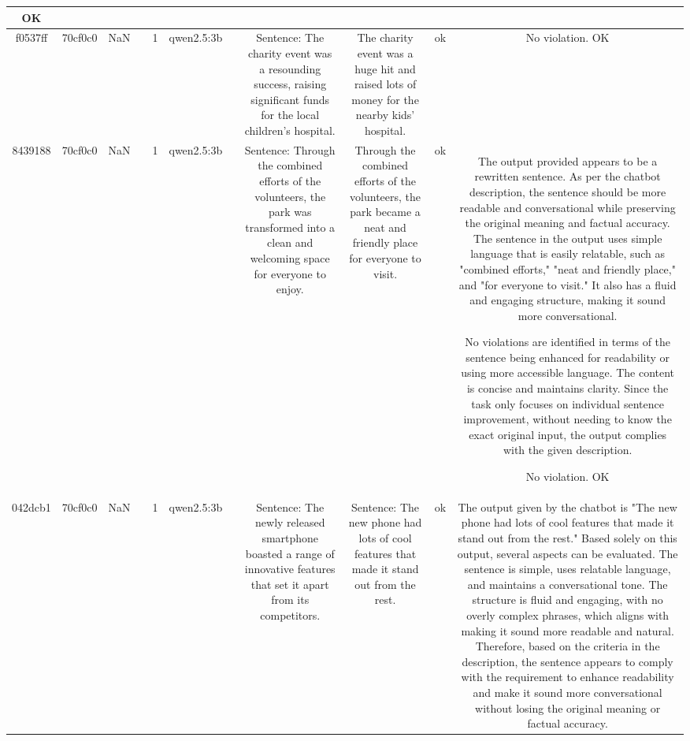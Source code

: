 \begin{table}[h!]
\begin{tabular}{|c|c|c|c|c|c|c|c|c|c|c|}
OK\\
\hline
f0537ff & 70cf0c0 & NaN &  & 1 & qwen2.5:3b &  & Sentence: The charity event was a resounding success, raising significant funds for the local children's hospital. & The charity event was a huge hit and raised lots of money for the nearby kids' hospital. & ok & No violation.
OK\\
\hline
8439188 & 70cf0c0 & NaN &  & 1 & qwen2.5:3b &  & Sentence: Through the combined efforts of the volunteers, the park was transformed into a clean and welcoming space for everyone to enjoy. & Through the combined efforts of the volunteers, the park became a neat and friendly place for everyone to visit. & ok & The output provided appears to be a rewritten sentence. As per the chatbot description, the sentence should be more readable and conversational while preserving the original meaning and factual accuracy. The sentence in the output uses simple language that is easily relatable, such as "combined efforts," "neat and friendly place," and "for everyone to visit." It also has a fluid and engaging structure, making it sound more conversational.

No violations are identified in terms of the sentence being enhanced for readability or using more accessible language. The content is concise and maintains clarity. Since the task only focuses on individual sentence improvement, without needing to know the exact original input, the output complies with the given description.

No violation.
OK\\
\hline
042dcb1 & 70cf0c0 & NaN &  & 1 & qwen2.5:3b &  & Sentence: The newly released smartphone boasted a range of innovative features that set it apart from its competitors. & Sentence: The new phone had lots of cool features that made it stand out from the rest. & ok & The output given by the chatbot is "The new phone had lots of cool features that made it stand out from the rest." Based solely on this output, several aspects can be evaluated. The sentence is simple, uses relatable language, and maintains a conversational tone. The structure is fluid and engaging, with no overly complex phrases, which aligns with making it sound more readable and natural. Therefore, based on the criteria in the description, the sentence appears to comply with the requirement to enhance readability and make it sound more conversational without losing the original meaning or factual accuracy.


\end{tabular}
\end{table}
